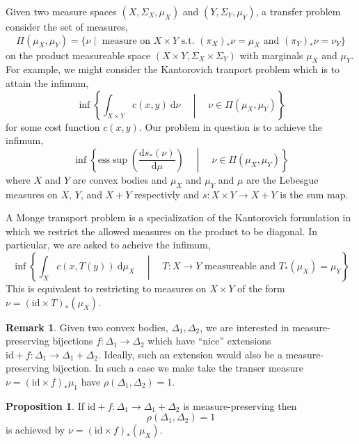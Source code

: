 \documentclass[12pt]{extarticle}
\newcommand{\id}{\mathrm{id}}
\theoremstyle{definition}
\newtheorem{proposition}[theorem]{Proposition}
\newtheorem{remark}{Remark}
\newenvironment{definition}[1][Definition:]{\begin{trivlist}
\item[\hskip \labelsep {\bfseries #1}]}{\end{trivlist}}
\renewcommand{\d}[1]{\mathrm{d} #1}
\begin{document}
\begin{definition}
Given two measure spaces $(X, \Sigma_X, \mu_X)$ and $(Y, \Sigma_Y, \mu_Y)$, a transfer problem consider the set of measures,
\[ \Pi(\mu_X, \mu_Y) = \{ \nu \mid \text{ measure on } X \times Y \text{ s.t. } (\pi_X)_* \nu = \mu_X \text{ and } (\pi_Y)_* \nu = \nu_Y \} \]
on the product measureable space $(X \times Y, \Sigma_X \times \Sigma_Y)$ with marginals $\mu_X$ and $\mu_Y$. For example, we might consider the Kantorovich tranport problem which is to attain the infimum,
\[ \inf \left\{ \int_{X \times Y} c(x, y) \: \d{\nu} \quad \middle| \quad \nu \in \Pi(\mu_X, \mu_Y) \right\} \] 
for some cost function $c(x, y)$. Our problem in question is to achieve the infimum,
\[ \inf \left\{ \mathrm{ess} \sup \left( \frac{\d{s_* (\nu)}}{\d{\mu}} \right) \quad \middle| \quad \nu \in \Pi(\mu_X, \mu_Y) \right\} \]
where $X$ and $Y$ are convex bodies and $\mu_X$ and $\mu_Y$ and $\mu$ are the Lebesgue measures on $X$, $Y$, and $X + Y$ respectivly and $s : X \times Y \to X + Y$ is the sum map. 
\end{definition}

\begin{definition}
A Monge transport problem is a specialization of the Kantorovich formulation in which we restrict the allowed measures on the product to be diagonal. In particular, we are asked to acheive the infimum,
\[ \inf \left\{ \int_{X} c(x, T(y)) \: \d{\mu_X} \quad \middle| \quad T : X \to Y \text{ measureable and } T_* (\mu_X) = \mu_Y \right\} \] 
This is equivalent to restricting to measures on $X \times Y$ of the form $\nu = (\id \times T)_* (\mu_X)$. 
\end{definition}

\begin{remark}
Given two convex bodies, $\Delta_1, \Delta_2$, we are interested in measure-preserving bijections $f : \Delta_1 \to \Delta_2$ which have ``nice'' extensions $\id + f : \Delta_1 \to \Delta_1 + \Delta_2$. Ideally, such an extension would also be a measure-preserving bijection. In such a case we make take the transer measure $\nu = (\id \times f)_* \mu_1$ have $\rho(\Delta_1, \Delta_2) = 1$. 
\end{remark}

\begin{proposition}
If $\id + f : \Delta_1 \to \Delta_1 + \Delta_2$ is measure-preserving then 
\[ \rho(\Delta_1, \Delta_2) = 1 \]
is achieved by $\nu = (\id \times f)_*(\mu_X)$.
\end{proposition}
\end{document}
